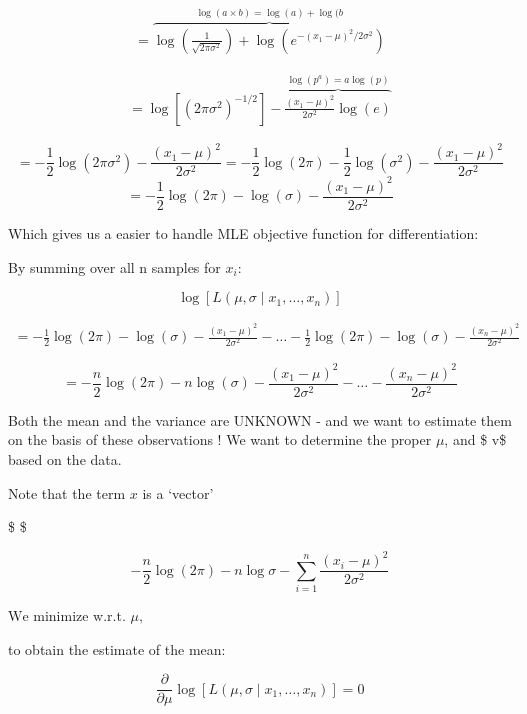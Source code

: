\documentclass[
  12 pt,
  a4paper,
]{book}
\numberwithin{equation}{section}
\theoremstyle{plain}      %
\theoremstyle{definition} %
\theoremstyle{remark}     %
\theoremstyle{note}         %
\begin{document}
\begin{align}
=\overbrace{\log \left(\frac{1}{\sqrt{2 \pi \sigma^{2}}}\right)+ \log \left(e^{-\left(x_{1}-\mu\right)^{2} / 2 \sigma^{2}}\right)}^{\log(a \times b) = \log(a) + \log(b}
\end{align}

\begin{align}
=\log \left[\left(2 \pi \sigma^{2}\right)^{-1 / 2}\right] - \overbrace{ \frac{\left(x_{1}-\mu\right)^{2}}{2 \sigma^{2}} \log (e)}^{\log \left(p^{a}\right) =a \log (p)}
\end{align}

\[
 = -\frac{1}{2} \log \left(2 \pi \sigma^{2}\right) -\frac{\left(x_{1}-\mu\right)^{2}}{2 \sigma^{2}} = -\frac{1}{2} \log (2 \pi)-\frac{1}{2} \log \left(\sigma^{2}\right)-\frac{\left(x_{1}-\mu\right)^{2}}{2 \sigma^{2}}
\] \[
= -\frac{1}{2} \log (2 \pi)-\log (\sigma)-\frac{\left(x_{1}-\mu\right)^{2}}{2 \sigma^{2}}
\]

Which gives us a easier to handle MLE objective function for
differentiation:

By summing over all n samples for \(x_{i}\):

\[
\log \left[L\left(\mu, \sigma \mid x_{1}, \ldots, x_{n}\right)\right]
\]

\[
\begin{gathered}
=-\frac{1}{2} \log (2 \pi)-\log (\sigma)-\frac{\left(x_{1}-\mu\right)^{2}}{2 \sigma^{2}}
-\ldots-\frac{1}{2} \log (2 \pi)-\log (\sigma)-\frac{\left(x_{n}-\mu\right)^{2}}{2 \sigma^{2}}
\end{gathered}
\]

\[
=-\frac{n}{2} \log (2 \pi)-n \log (\sigma)-\frac{\left(x_{1}-\mu\right)^{2}}{2 \sigma^{2}}-\ldots-\frac{\left(x_{n}-\mu\right)^{2}}{2 \sigma^{2}}
\]

Both the mean and the variance are UNKNOWN - and we want to estimate
them on the basis of these observations ! We want to determine the
proper \(\mu\), and \$ v\$ based on the data.

Note that the term \(x\) is a `vector'

\$ \$

\[
-\frac{n}{2} \log (2 \pi)- n \log \sigma -\sum_{i=1}^{n} \frac{\left(x_{i}-\mu\right)^{2}}{2 \sigma^{2}}
\]

\(\text {We minimize w.r.t. } \mu \text {, }\)

to obtain the estimate of the mean:

\[
\frac{\partial}{\partial \mu} \log \left[L\left(\mu, \sigma \mid x_{1}, \ldots, x_{n}\right)\right] = 0
\]
\end{document}
